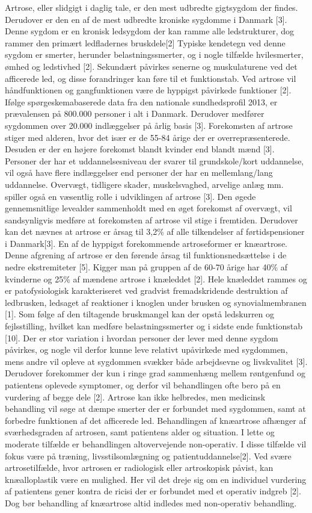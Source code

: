 Artrose, eller slidgigt i daglig tale, er den mest udbredte gigtsygdom der findes. Derudover er den en af de mest udbredte kroniske sygdomme i Danmark [3]. Denne sygdom er en kronisk ledsygdom der kan ramme alle ledstrukturer, dog rammer den primært ledfladernes bruskdele[2] 
Typiske kendetegn ved denne sygdom er smerter, herunder belastningssmerter, og i nogle tilfælde hvilesmerter, ømhed og ledstivhed  [2]. Sekundært påvirkes senerne og muskulaturene ved det afficerede led, og disse forandringer kan føre til et funktionstab. Ved artrose vil håndfunktionen og gangfunktionen være de hyppigst påvirkede funktioner [2]. 
Ifølge spørgeskemabaserede data fra den nationale sundhedsprofil 2013, er prævalensen på 800.000 personer i alt i Danmark. Derudover medfører sygdommen  over 20.000 indlæggelser på årlig basis [3]. Forekomsten af artrose stiger med alderen, hvor det især er de 55-84 årige der er overrepræsenterede. Desuden er der en højere forekomst blandt kvinder end blandt mænd [3]. 
Personer der har et uddannelsesniveau der svarer til grundskole/kort uddannelse, vil også have flere indlæggelser end personer der har en mellemlang/lang uddannelse. Overvægt, tidligere skader, muskelsvaghed, arvelige anlæg mm. spiller også en væsentlig rolle i udviklingen af artrose [3]. Den øgede gennemsnitlige levealder sammenholdt med en øget forekomst af overvægt, vil sandsynligvis medføre at  forekomsten af artrose vil stige i fremtiden. Derudover kan det nævnes at artrose er årsag til 3,2\% af alle tilkendelser af førtidspensioner i Danmark[3].
En af de hyppigst forekommende artroseformer er knæartrose. Denne afgrening af artrose er den førende årsag til funktionsnedsættelse i de nedre ekstremiteter [5]. Kigger man på gruppen af de 60-70 årige har 40\% af kvinderne og 25\% af mændene artrose i knæleddet [2].
Hele knæleddet rammes og er patofysiologisk karakteriseret ved gradvist fremadskridende destruktion af ledbrusken, ledsaget af reaktioner i knoglen under brusken og synovialmembranen [1]. Som følge af den tiltagende bruskmangel kan der opstå ledskurren og fejlsstilling, hvilket kan medføre belastningssmerter og i sidste ende funktionstab [10].  
Der er stor variation i hvordan personer der lever med denne sygdom påvirkes, og nogle vil derfor kunne leve relativt upåvirkede med sygdommen, mens andre vil opleve at sygdommen svækker både arbejdsevne og livskvalitet [3]. Derudover forekommer der kun i ringe grad sammenhæng mellem røntgenfund og patientens oplevede symptomer, og derfor vil behandlingen ofte bero på en vurdering af begge dele [2].
Artrose kan ikke helbredes, men medicinsk behandling vil søge at dæmpe smerter der er forbundet med sygdommen, samt at forbedre funktionen af det afficerede led. Behandlingen af knæartrose afhænger af sværhedsgraden af artrosen, samt patientens alder og situation. I lette og moderate tilfælde er behandlingen altovervejende non-operativ. I disse tilfælde vil fokus være på træning, livsstilsomlægning og patientuddannelse[2].
Ved svære artrosetilfælde, hvor artrosen er radiologisk eller artroskopisk påvist, kan knæalloplastik være en mulighed. Her vil det dreje sig om en individuel vurdering af patientens gener kontra de ricisi der er forbundet med et operativ indgreb [2]. Dog bør behandling af knæartrose altid indledes med non-operativ behandling.


